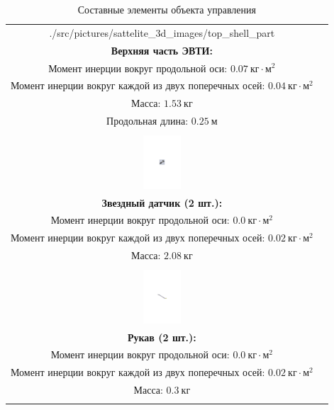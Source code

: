 \begin{table}[ht!]
\begin{tabular}{|c|c|}
                            {./src/pictures/sattelite_3d_images/top_shell_part} &
            \shortstack[l] {
                \rule{0pt}{2mm} \\
                \textbf{Верхняя часть ЭВТИ:} \\
                Момент инерции вокруг продольной оси: $0.07 ~\textit{кг} \cdot \textit{м}^{2}$ \\
                Момент инерции вокруг каждой из двух поперечных  осей: $0.04 ~\textit{кг} \cdot \textit{м}^{2}$ \\
                Масса: $1.53 ~\textit{кг}$ \\
                Продольная длина: $0.25 ~\textit{м}$ \\
                \rule{0pt}{2mm}
            } \\
        \hline
            \includegraphics[height=20mm, keepaspectratio]
                            {./src/pictures/sattelite_3d_images/star_sensor} &
            \shortstack[l] {
                \rule{0pt}{2mm} \\
                \textbf{Звездный датчик (2 шт.):} \\
                Момент инерции вокруг продольной оси: $0.0 ~\textit{кг} \cdot \textit{м}^{2}$ \\
                Момент инерции вокруг каждой из двух поперечных  осей: $0.02 ~\textit{кг} \cdot \textit{м}^{2}$ \\
                Масса: $2.08 ~\textit{кг}$ \\
                \rule{0pt}{2mm}
            } \\
        \hline
            \includegraphics[height=20mm, keepaspectratio]
                            {./src/pictures/sattelite_3d_images/sleeve} &
            \shortstack[l] {
                \rule{0pt}{2mm} \\
                \textbf{Рукав (2 шт.):} \\
                Момент инерции вокруг продольной оси: $0.0 ~\textit{кг} \cdot \textit{м}^{2}$ \\
                Момент инерции вокруг каждой из двух поперечных  осей: $0.02 ~\textit{кг} \cdot \textit{м}^{2}$ \\
                Масса: $0.3 ~\textit{кг}$ \\
                \rule{0pt}{2mm}
            } \\
        \hline
    \end{tabular}

    \caption{Составные элементы объекта управления}
\end{table}

